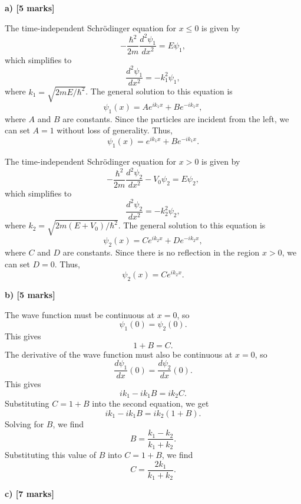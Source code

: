 \documentclass{article}
\begin{document}
\textbf{a) [5 marks]}

The time-independent Schrödinger equation for $x \leq 0$ is given by
\[
-\frac{\hbar^2}{2m}\frac{d^2 \psi_1}{dx^2} = E \psi_1,
\]
which simplifies to
\[
\frac{d^2 \psi_1}{dx^2} = -k_1^2 \psi_1,
\]
where $k_1 = \sqrt{2mE/\hbar^2}$. The general solution to this equation is
\[
\psi_1(x) = Ae^{ik_1x} + Be^{-ik_1x},
\]
where $A$ and $B$ are constants. Since the particles are incident from the left, we can set $A = 1$ without loss of generality. Thus,
\[
\psi_1(x) = e^{ik_1x} + Be^{-ik_1x}.
\]

The time-independent Schrödinger equation for $x > 0$ is given by
\[
-\frac{\hbar^2}{2m}\frac{d^2 \psi_2}{dx^2} - V_0 \psi_2 = E \psi_2,
\]
which simplifies to
\[
\frac{d^2 \psi_2}{dx^2} = -k_2^2 \psi_2,
\]
where $k_2 = \sqrt{2m(E + V_0)/\hbar^2}$. The general solution to this equation is
\[
\psi_2(x) = Ce^{ik_2x} + De^{-ik_2x},
\]
where $C$ and $D$ are constants. Since there is no reflection in the region $x > 0$, we can set $D = 0$. Thus,
\[
\psi_2(x) = Ce^{ik_2x}.
\]

\textbf{b) [5 marks]}

The wave function must be continuous at $x = 0$, so
\[
\psi_1(0) = \psi_2(0).
\]
This gives
\[
1 + B = C.
\]
The derivative of the wave function must also be continuous at $x = 0$, so
\[
\frac{d\psi_1}{dx}(0) = \frac{d\psi_2}{dx}(0).
\]
This gives
\[
ik_1 - ik_1B = ik_2C.
\]
Substituting $C = 1 + B$ into the second equation, we get
\[
ik_1 - ik_1B = ik_2(1 + B).
\]
Solving for $B$, we find
\[
B = \frac{k_1 - k_2}{k_1 + k_2}.
\]
Substituting this value of $B$ into $C = 1 + B$, we find
\[
C = \frac{2k_1}{k_1 + k_2}.
\]

\textbf{c) [7 marks]}
\end{document}
